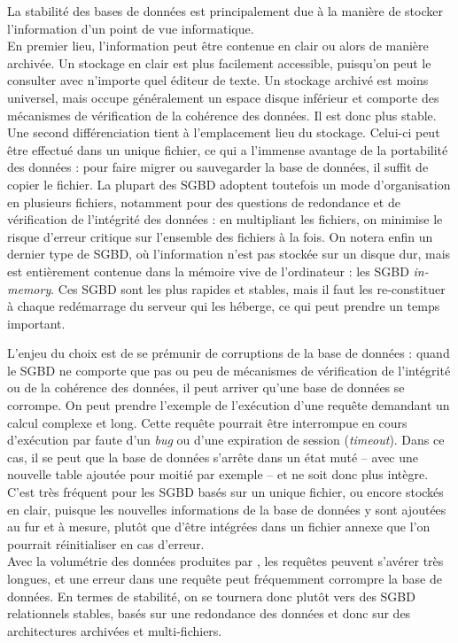 La stabilité des bases de données est principalement due à la manière de stocker l'information d'un point de vue informatique.\\
En premier lieu, l'information peut être contenue \og en clair\fg{} ou alors de manière archivée.
Un stockage \og en clair\fg{} est plus facilement accessible, puisqu'on peut le consulter avec n'importe quel éditeur de texte.
Un stockage archivé est moins universel, mais occupe généralement un espace disque inférieur et comporte des mécanismes de vérification de la cohérence des données.
Il est donc plus stable.\\
Une second différenciation tient à l'emplacement lieu du stockage.
Celui-ci peut être effectué dans un unique fichier, ce qui a l'immense avantage de la portabilité des données : pour faire migrer ou sauvegarder la base de données, il suffit de copier le fichier.
La plupart des SGBD adoptent toutefois un mode d'organisation en plusieurs fichiers, notamment pour des questions de redondance et de vérification de l'intégrité des données : en multipliant les fichiers, on minimise le risque d'erreur critique sur l'ensemble des fichiers à la fois.
On notera enfin un dernier type de SGBD, où l'information n'est pas stockée sur un disque dur, mais est entièrement contenue dans la mémoire vive de l'ordinateur : les SGBD \og \textit{in-memory}\fg{}.
Ces SGBD sont les plus rapides et stables, mais il faut les re-constituer à chaque redémarrage du serveur qui les héberge, ce qui peut prendre un temps important.

L'enjeu du choix est de se prémunir de \og corruptions\fg{} de la base de données : quand le SGBD ne comporte que pas ou peu de mécanismes de vérification de l'intégrité ou de la cohérence des données, il peut arriver qu'une base de données se corrompe.
On peut prendre l'exemple de l'exécution d'une requête demandant un calcul complexe et long.
Cette requête pourrait être interrompue en cours d'exécution par faute d'un \textit{bug} ou d'une expiration de session (\textit{timeout}). Dans ce cas, il se peut que la base de données s'arrête dans un état muté -- avec une nouvelle table ajoutée pour moitié par exemple -- et ne soit donc plus intègre.
C'est très fréquent pour les SGBD basés sur un unique fichier, ou encore stockés en clair, puisque les nouvelles informations de la base de données y sont ajoutées au fur et à mesure, plutôt que d'être intégrées dans un fichier annexe que l'on pourrait réinitialiser en cas d'erreur.\\
Avec la volumétrie des données produites par \simfeodal{}, les requêtes peuvent s'avérer très longues, et une erreur dans une requête peut fréquemment corrompre la base de données.
En termes de stabilité, on se tournera donc plutôt vers des SGBD relationnels stables, basés sur une redondance des données et donc sur des architectures archivées et multi-fichiers.


